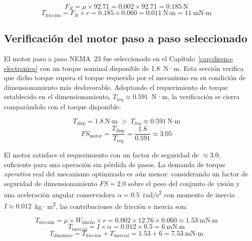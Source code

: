 \begin{equation}
F_R = \mu \times 92.71 = 0.002 \times 92.71 = 0.185~\text{N}
\end{equation}
\begin{equation}
T_{\text{fricción}} = F_R \times r = 0.185 \times 0.060 = 0.011~\text{N·m} = 11~\text{mN·m}
\end{equation}

\subsection{Verificación del motor paso a paso seleccionado}\label{subsec:verificacion-motor}

El motor paso a paso NEMA~23 fue seleccionado en el Capítulo~\ref{cap:diseno-electronico} con un torque nominal disponible de 1.8~N·m. Esta sección verifica que dicho torque supera el torque requerido por el mecanismo en su condición de dimensionamiento más desfavorable. Adoptando el requerimiento de torque establecido en el dimensionamiento, $T_{\text{req}} \approx 0.591$~N·m, la verificación se cierra comparándolo con el torque disponible:

\begin{equation}
T_{\text{disp}} = 1.8~\text{N·m} \;>\; T_{\text{req}} \approx 0.591~\text{N·m}
\end{equation}
\begin{equation}
FS_{\text{motor}} = \frac{T_{\text{disp}}}{T_{\text{req}}} = \frac{1.8}{0.591} \approx 3.05
\end{equation}

El motor satisface el requerimiento con un factor de seguridad de $\approx 3.0$, suficiente para una operación sin pérdida de pasos. La demanda de torque \emph{operativa} real del mecanismo optimizado es aún menor: considerando un factor de seguridad de dimensionamiento $FS = 2.0$ sobre el peso del conjunto de visión y una aceleración angular conservadora $\alpha = 0.5$~rad/s\textsuperscript{2} con momento de inercia $I \approx 0.012$~kg·m\textsuperscript{2}, las contribuciones de fricción e inercia son:

\begin{equation}
T_{\text{fricción}} = \mu \times W_{\text{diseño}} \times r = 0.002 \times 12.76 \times 0.060 \approx 1.53~\text{mN·m}
\end{equation}
\begin{equation}
T_{\text{inercial}} = I \times \alpha = 0.012 \times 0.5 = 6~\text{mN·m}
\end{equation}
\begin{equation}
T_{\text{dinámico}} = T_{\text{fricción}} + T_{\text{inercial}} = 1.53 + 6 = 7.53~\text{mN·m}
\end{equation}

